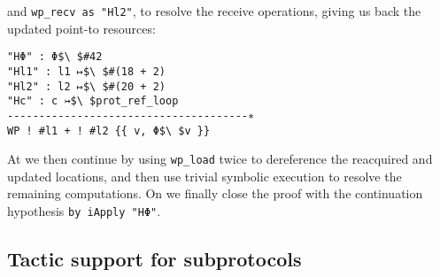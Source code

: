 and \lstinline{wp_recv as "Hl2"}, to resolve the receive operations, giving us back the updated
point-to resources:
\begin{lstlisting}
"HΦ" : Φ$\ $#42
"Hl1" : l1 ↦$\ $#(18 + 2)
"Hl2" : l2 ↦$\ $#(20 + 2)
"Hc" : c ↣$\ $prot_ref_loop
--------------------------------------∗
WP ! #l1 + ! #l2 {{ v, Φ$\ $v }}
\end{lstlisting}
At  we then continue by using \lstinline{wp_load} twice to
dereference the reacquired and updated locations, and then use trivial symbolic execution
to resolve the remaining computations.
On  we finally close the proof with the continuation
hypothesis \lstinline{by iApply "HΦ"}.

\subsection{Tactic support for subprotocols}
\label{sec:coq_subprot_proof}

